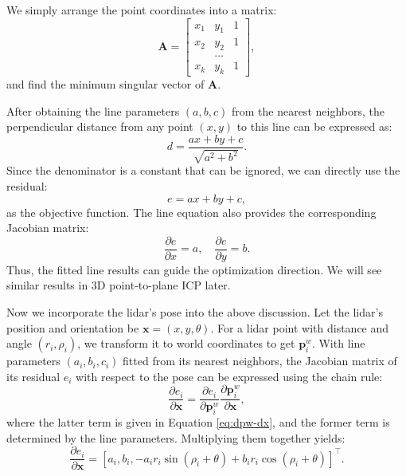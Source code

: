 We simply arrange the point coordinates into a matrix:
\begin{equation}\label{key}
	\bm{A} = \begin{bmatrix}
		x_1 & y_1 & 1 \\
		x_2 & y_2 & 1 \\
		& \ldots &\\
		x_k & y_k & 1
	\end{bmatrix},
\end{equation}
and find the minimum singular vector of $\bm{A}$.

After obtaining the line parameters $(a,b,c)$ from the nearest neighbors, the perpendicular distance from any point $(x,y)$ to this line can be expressed as:
\begin{equation}\label{key}
	d = \frac{ax+by+c}{\sqrt{a^2+b^2}}.
\end{equation}
Since the denominator is a constant that can be ignored, we can directly use the residual:
\begin{equation}\label{key}
	e = ax+by+c,
\end{equation}
as the objective function. The line equation also provides the corresponding Jacobian matrix:
\begin{equation}\label{key}
	\frac{\partial e}{\partial x} = a, \quad \frac{\partial e}{\partial y} = b.
\end{equation}
Thus, the fitted line results can guide the optimization direction. We will see similar results in 3D point-to-plane ICP later.

Now we incorporate the lidar's pose into the above discussion. Let the lidar's position and orientation be $\bm{x} = (x,y, \theta)$. For a lidar point with distance and angle $(r_i, \rho_i)$, we transform it to world coordinates to get $\bm{p}_i^w$. With line parameters $(a_i, b_i, c_i)$ fitted from its nearest neighbors, the Jacobian matrix of its residual $e_i$ with respect to the pose can be expressed using the chain rule:
\begin{equation}\label{key}
	\frac{\partial e_i}{\partial \bm{x}} = \frac{\partial e_i}{\partial \bm{p}_i^w} \frac{\partial \bm{p}_i^w}{\partial \bm{x}},
\end{equation} 
where the latter term is given in Equation \eqref{eq:dpw-dx}, and the former term is determined by the line parameters. Multiplying them together yields:
\begin{equation}\label{key}
	\frac{\partial e_i}{\partial \bm{x}} = [a_i, b_i, -a_i r_i \sin(\rho_i + \theta) + b_i r_i \cos(\rho_i + \theta)]^\top.
\end{equation}


